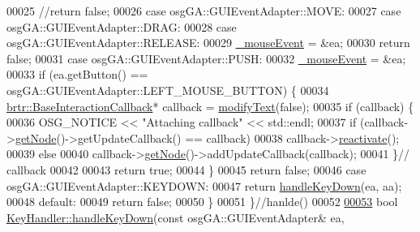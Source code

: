 \begin{DoxyCode}
00025             \textcolor{comment}{//return false;}
00026         \textcolor{keywordflow}{case} osgGA::GUIEventAdapter::MOVE:
00027         \textcolor{keywordflow}{case} osgGA::GUIEventAdapter::DRAG:
00028         \textcolor{keywordflow}{case} osgGA::GUIEventAdapter::RELEASE:
00029             \hyperlink{classbrtr_1_1_key_handler_a1b2404dcd19426a93d4474cd45da84e8}{\_mouseEvent} = &ea;
00030             \textcolor{keywordflow}{return} \textcolor{keyword}{false};
00031         \textcolor{keywordflow}{case} osgGA::GUIEventAdapter::PUSH:
00032             \hyperlink{classbrtr_1_1_key_handler_a1b2404dcd19426a93d4474cd45da84e8}{\_mouseEvent} = &ea;
00033             \textcolor{keywordflow}{if} (ea.getButton() == osgGA::GUIEventAdapter::LEFT\_MOUSE\_BUTTON) \{
00034                 \hyperlink{classbrtr_1_1_base_interaction_callback}{brtr::BaseInteractionCallback}* callback = 
      \hyperlink{classbrtr_1_1_key_handler_a1925fa114839192716167477714abfdc}{modifyText}(\textcolor{keyword}{false});
00035                 \textcolor{keywordflow}{if} (callback) \{
00036                     OSG\_NOTICE << \textcolor{stringliteral}{"Attaching callback"} << std::endl;
00037                     \textcolor{keywordflow}{if} (callback->\hyperlink{classbrtr_1_1_base_interaction_callback_aafca24ccde1cf21f4132f65a83e0b2bc}{getNode}()->getUpdateCallback() == callback)
00038                         callback->\hyperlink{classbrtr_1_1_base_interaction_callback_a95ede7c8aa0dc1e067ae64615ecb23db}{reactivate}();
00039                     \textcolor{keywordflow}{else}
00040                         callback->\hyperlink{classbrtr_1_1_base_interaction_callback_aafca24ccde1cf21f4132f65a83e0b2bc}{getNode}()->addUpdateCallback(callback);
00041                 \}\textcolor{comment}{// callback}
00042                 
00043                 \textcolor{keywordflow}{return} \textcolor{keyword}{true};
00044             \}
00045             \textcolor{keywordflow}{return} \textcolor{keyword}{false};
00046         \textcolor{keywordflow}{case} osgGA::GUIEventAdapter::KEYDOWN:
00047             \textcolor{keywordflow}{return} \hyperlink{classbrtr_1_1_key_handler_a5af6a6e66e8754591b3425addc6e6858}{handleKeyDown}(ea, aa);
00048         \textcolor{keywordflow}{default}:
00049             \textcolor{keywordflow}{return} \textcolor{keyword}{false};
00050         \}
00051     \}\textcolor{comment}{//hanlde()}
00052 
\hypertarget{_key_handler_8cpp_source_l00053}{}\hyperlink{classbrtr_1_1_key_handler_a5af6a6e66e8754591b3425addc6e6858}{00053}     \textcolor{keywordtype}{bool} \hyperlink{classbrtr_1_1_key_handler_a5af6a6e66e8754591b3425addc6e6858}{KeyHandler::handleKeyDown}(\textcolor{keyword}{const} osgGA::GUIEventAdapter& ea, 

\end{DoxyCode}

